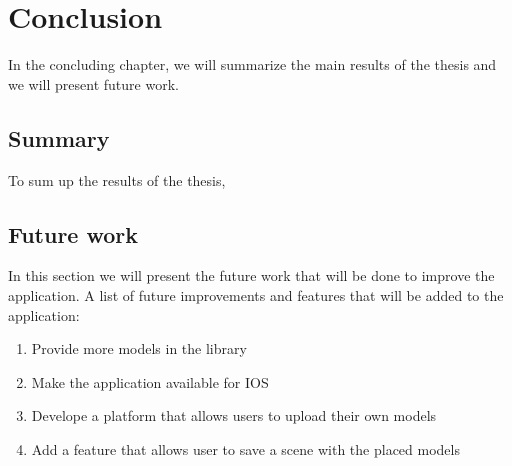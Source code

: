 \chapter{Conclusion}\label{cap:conclusion}
In the concluding chapter, we will summarize the main results of the thesis and we will present future work.
\section{Summary}
To sum up the results of the thesis,



\section{Future work}
In this section we will present the future work that will be done to improve the application.
A list of future improvements and features that will be added to the application:
\begin{enumerate}
    \item{Provide more models in the library}
    \item{Make the application available for IOS}
    \item{Develope a platform that allows users to upload their own models}
    \item{Add a feature that allows user to save a scene with the placed models}
\end{enumerate}
